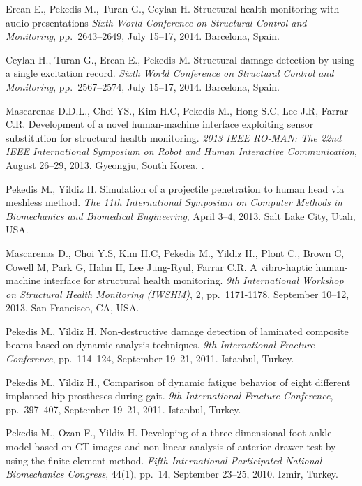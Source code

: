 \documentclass[10pt]{article}
\begin{document}
\begin{bibenum}
	\item Ercan E., Pekedis M., Turan G., Ceylan H. Structural health monitoring with audio presentations 
		\emph{Sixth World Conference on Structural Control and Monitoring}, pp.~2643--2649, July 15--17, 2014. Barcelona, Spain.

	\item Ceylan H., Turan G., Ercan E., Pekedis M.	Structural damage detection by using a single 
		excitation record.	\emph{Sixth World Conference on Structural Control and Monitoring},
		pp.~2567--2574, July 15--17, 2014. Barcelona, Spain.
		
	\item Mascarenas D.D.L., Choi YS., Kim H.C, Pekedis M., Hong S.C, Lee J.R, Farrar C.R. Development of 
		a novel human-machine interface exploiting sensor substitution for structural health monitoring. 
		\emph{2013 IEEE RO-MAN: The 22nd IEEE International Symposium on Robot and Human Interactive Communication}, 
		August 26--29, 2013. Gyeongju, South Korea.  
		. 
			
	\item Pekedis M., Yildiz H. Simulation of a projectile penetration to human head via meshless method.
		\emph{The 11th International Symposium on Computer Methods in Biomechanics and Biomedical Engineering}, 
		April 3--4, 2013. Salt Lake City, Utah, USA. 
		
	\item Mascarenas D., Choi Y.S, Kim H.C, Pekedis M., Yildiz H., Plont C., Brown C, Cowell M, Park G, Hahn H, 
		Lee Jung-Ryul, Farrar C.R. A vibro-haptic human-machine interface for structural health monitoring. 
		\emph{9th International Workshop on Structural Health Monitoring (IWSHM)}, 2, pp.~1171-1178, September 10--12, 2013.
		San Francisco, CA, USA.
	
	\item Pekedis M., Yildiz H. Non-destructive damage detection of laminated composite beams based on dynamic analysis techniques.
		\emph{9th International Fracture Conference}, pp.~114--124, September 19--21, 2011. Istanbul, Turkey.
		
	\item Pekedis M., Yildiz H., Comparison of dynamic fatigue behavior of eight different implanted hip prostheses during gait.
		\emph{9th International Fracture Conference}, pp.~397--407, September 19--21, 2011. Istanbul, Turkey. 

	\item Pekedis M., Ozan F., Yildiz H. Developing of a three-dimensional foot ankle model based on CT images and non-linear 
		analysis of anterior drawer test by using the finite element method. 
		\emph{Fifth International Participated National Biomechanics Congress}, 44(1), pp.~14, September 23--25, 2010. Izmir, Turkey. 
		\\ 
		

\end{bibenum}
\end{document}
